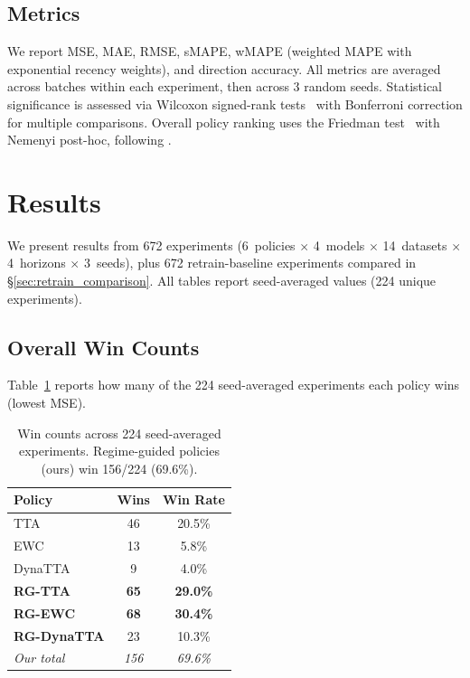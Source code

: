 \documentclass[journal]{IEEEtran}
\begin{document}
\subsection{Metrics}

We report MSE, MAE, RMSE, sMAPE, wMAPE (weighted MAPE with exponential recency weights), and direction accuracy. All metrics are averaged across batches within each experiment, then across 3 random seeds. Statistical significance is assessed via Wilcoxon signed-rank tests~\cite{wilcoxon1945} with Bonferroni correction for multiple comparisons. Overall policy ranking uses the Friedman test~\cite{friedman1937} with Nemenyi post-hoc, following \cite{demsar2006statistical}.


\section{Results}
\label{sec:results}

We present results from 672 experiments (6~policies $\times$ 4~models $\times$ 14~datasets $\times$ 4~horizons $\times$ 3~seeds), plus 672 retrain-baseline experiments compared in \S\ref{sec:retrain_comparison}. All tables report seed-averaged values (224 unique experiments).

\subsection{Overall Win Counts}

Table~\ref{tab:wins} reports how many of the 224 seed-averaged experiments each policy wins (lowest MSE).

\begin{table}[t]
\centering
\caption{Win counts across 224 seed-averaged experiments. Regime-guided policies (ours) win 156/224 (69.6\%).}
\label{tab:wins}
\small
\begin{tabular}{lcc}
\toprule
Policy & Wins & Win Rate \\
\midrule
TTA & 46 & 20.5\% \\
EWC & 13 & 5.8\% \\
DynaTTA & 9 & 4.0\% \\
\midrule
\textbf{RG-TTA} & \textbf{65} & \textbf{29.0\%} \\
\textbf{RG-EWC} & \textbf{68} & \textbf{30.4\%} \\
\textbf{RG-DynaTTA} & 23 & 10.3\% \\
\midrule
\emph{Our total} & \emph{156} & \emph{69.6\%} \\
\bottomrule
\end{tabular}
\end{table}
\end{document}
